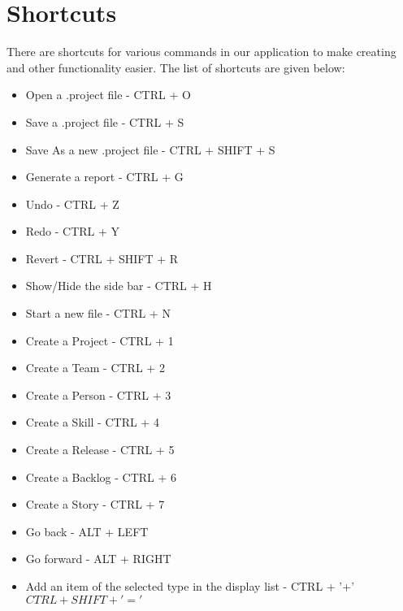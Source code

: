 \section{Shortcuts}

There are shortcuts for various commands in our application to make creating and other functionality easier. The list of shortcuts are given below:

\begin{itemize}
\item Open a .project file - CTRL + O
\item Save a .project file - CTRL + S
\item Save As a new .project file - CTRL + SHIFT + S
\item Generate a report - CTRL + G
\item Undo - CTRL + Z
\item Redo - CTRL + Y
\item Revert - CTRL + SHIFT + R
\item Show/Hide the side bar - CTRL + H
\item Start a new file - CTRL + N
\item Create a Project - CTRL + 1
\item Create a Team - CTRL + 2
\item Create a Person - CTRL + 3
\item Create a Skill - CTRL + 4
\item Create a Release - CTRL + 5
\item Create a Backlog - CTRL + 6
\item Create a Story - CTRL + 7
\item Go back - ALT + LEFT
\item Go forward - ALT + RIGHT
\item Add an item of the selected type in the display list - CTRL + '+' \(CTRL + SHIFT + '='\)
\end{itemize}
